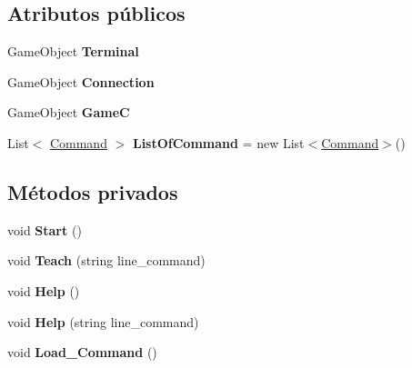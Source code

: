 \subsection*{Atributos públicos}
\begin{DoxyCompactItemize}
\item 
\mbox{\label{class_controller_a51323d3c4ec14f6cb08c5ff78f043294}} 
Game\+Object {\bfseries Terminal}
\item 
\mbox{\label{class_controller_af40ddeff071064e6f098552df3cfd34e}} 
Game\+Object {\bfseries Connection}
\item 
\mbox{\label{class_controller_a1eb5e590212ea6268156999f313bf76c}} 
Game\+Object {\bfseries GameC}
\item 
\mbox{\label{class_controller_ad900dbfae2bb9097caa6aeba1636030c}} 
List$<$ \mbox{\hyperlink{struct_controller_1_1_command}{Command}} $>$ {\bfseries List\+Of\+Command} = new List$<$\mbox{\hyperlink{struct_controller_1_1_command}{Command}}$>$()
\end{DoxyCompactItemize}
\subsection*{Métodos privados}
\begin{DoxyCompactItemize}
\item 
\mbox{\label{class_controller_afb3af298c368aea3203c2c0401f92eb5}} 
void {\bfseries Start} ()
\item 
\mbox{\label{class_controller_a5451887045a5b5daedd6fb1d0c9c90ae}} 
void {\bfseries Teach} (string line\+\_\+command)
\item 
\mbox{\label{class_controller_aec3ce5bf2c2fa1e9a3aba0b9c2475770}} 
void {\bfseries Help} ()
\item 
\mbox{\label{class_controller_ab6a32e48c4abe328f741916fbeccb0c5}} 
void {\bfseries Help} (string line\+\_\+command)
\item 
\mbox{\label{class_controller_abafc0ba1c023556d28a3034dca656d21}} 
void {\bfseries Load\+\_\+\+Command} ()
\end{DoxyCompactItemize}
